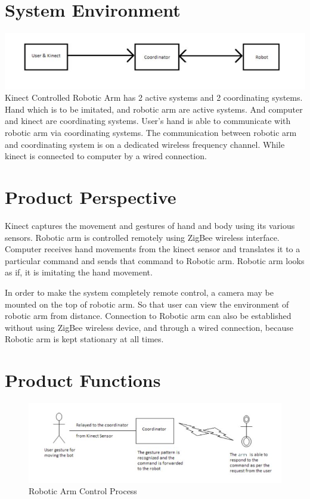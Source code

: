 \documentclass[a4wide]{scrreprt}
\begin{document}
\section{System Environment}
\includegraphics[scale=0.7]{pic0.jpg}\\
Kinect Controlled Robotic Arm has 2 active systems and 2 coordinating systems. Hand which is to be imitated, and robotic arm are active systems. And computer and kinect are coordinating systems. User's hand is able to communicate with robotic arm via coordinating systems. The communication between robotic arm and coordinating system is on a dedicated wireless frequency channel. While kinect is connected to computer by a wired connection.

\section{Product Perspective}
Kinect captures the movement and gestures of hand and body using its various sensors. Robotic arm is controlled remotely using ZigBee wireless interface. Computer receives hand movements from the kinect sensor and translates it to a particular command and sends that command to Robotic arm. Robotic arm looks as if, it is imitating the hand movement. 

In order to make the system completely remote control, a camera may be mounted on the top of robotic arm. So that user can view the environment of robotic arm from distance. Connection to Robotic arm can also be established without using ZigBee wireless device, and through a wired connection, because Robotic arm is kept stationary at all times.

\section{Product Functions}
\begin{figure}[htb]
\centering
\includegraphics[scale=0.6]{pic2.jpg}
\caption{Robotic Arm Control Process}
\end{figure}
\end{document}
